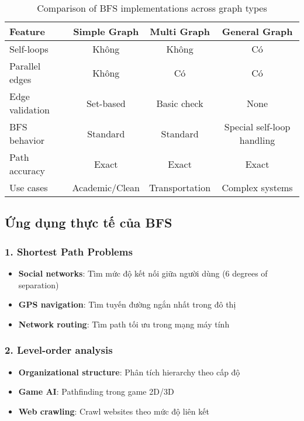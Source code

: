 \documentclass[12pt]{article}
\begin{document}
\begin{table}[H]
\centering
\footnotesize
\begin{tabular}{|l|c|c|c|}
\hline
\textbf{Feature} & \textbf{Simple Graph} & \textbf{Multi Graph} & \textbf{General Graph} \\
\hline
Self-loops & Không & Không & Có \\
Parallel edges & Không & Có & Có \\
Edge validation & Set-based & Basic check & None \\
BFS behavior & Standard & Standard & Special self-loop handling \\
Path accuracy & Exact & Exact & Exact \\
Use cases & Academic/Clean & Transportation & Complex systems \\
\hline
\end{tabular}
\caption{Comparison of BFS implementations across graph types}
\end{table}

\subsection*{Ứng dụng thực tế của BFS}

\subsubsection*{1. Shortest Path Problems}
\begin{itemize}
    \item \textbf{Social networks}: Tìm mức độ kết nối giữa người dùng (6 degrees of separation)
    \item \textbf{GPS navigation}: Tìm tuyến đường ngắn nhất trong đô thị
    \item \textbf{Network routing}: Tìm path tối ưu trong mạng máy tính
\end{itemize}

\subsubsection*{2. Level-order analysis}
\begin{itemize}
    \item \textbf{Organizational structure}: Phân tích hierarchy theo cấp độ
    \item \textbf{Game AI}: Pathfinding trong game 2D/3D
    \item \textbf{Web crawling}: Crawl websites theo mức độ liên kết
\end{itemize}
\end{document}
